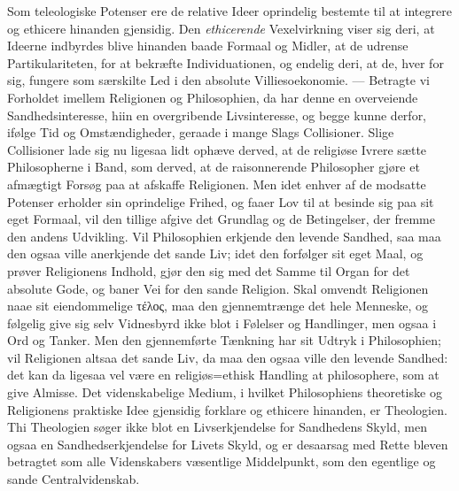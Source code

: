 \documentclass[12pt]{book}
\newcommand{\opage}[1]{\marginnote{\footnotesize\textit{[#1]}}}
\begin{document}
Som teleologiske Potenser ere de relative Ideer oprindelig bestemte til at integrere
og ethicere hinanden gjensidig. Den \emph{ethicerende} Vexelvirkning viser sig deri,
at Ideerne indbyrdes blive hinanden baade Formaal og Midler, at de udrense
Partikulariteten, for at bekræfte Individuationen, og endelig deri, at de, hver for
sig, fungere som særskilte Led i den absolute Villiesoekonomie. --- Betragte vi
Forholdet imellem Religionen og Philosophien, da har denne en overveiende
Sandhedsinteresse, hiin en overgribende Livsinteresse, og begge kunne derfor, ifølge
Tid og Omstændigheder, geraade i mange Slags Collisioner. Slige Collisioner lade sig
nu ligesaa lidt ophæve derved, at de religiøse Ivrere sætte Philosopherne i Band, som
derved, at de raisonnerende Philosopher gjøre et afmægtigt Forsøg paa at afskaffe
Religionen. Men idet enhver af de modsatte Potenser erholder sin oprindelige Frihed,
og faaer Lov til at besinde sig paa sit eget Formaal, vil den tillige afgive det
Grundlag og de Betingelser, der fremme den andens Udvikling. Vil Philosophien
erkjende den levende Sandhed, saa maa den ogsaa ville anerkjende det sande Liv; idet
den forfølger sit eget Maal, og prøver Religionens Indhold, gjør den sig med det
Samme til Organ for det absolute Gode, og baner Vei for den sande Religion. Skal
omvendt Religionen naae sit eiendommelige τέλος, maa den gjennemtrænge det hele
Menneske, og følgelig give sig selv Vidnesbyrd ikke blot i Følelser og Handlinger,
men ogsaa i Ord og Tanker. Men den gjennemførte Tænkning har sit Udtryk i
Philosophien; vil Religionen altsaa det sande Liv, da maa den ogsaa ville den levende
Sandhed: det kan da ligesaa
\opage{269} vel være en religiøs=ethisk Handling at philosophere, som at give Almisse. Det
videnskabelige Medium, i hvilket Philosophiens theoretiske og Religionens praktiske
Idee gjensidig forklare og ethicere hinanden, er Theologien. Thi Theologien søger ikke
blot en Livserkjendelse for Sandhedens Skyld, men ogsaa en Sandhedserkjendelse for
Livets Skyld, og er desaarsag med Rette bleven betragtet som alle Videnskabers
væsentlige Middelpunkt, som den egentlige og sande Centralvidenskab.
\end{document}
